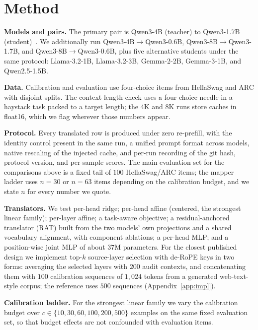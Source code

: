 \documentclass{article} %
\begin{document}

\section{Method}
\label{sec:method}

\textbf{Models and pairs.} The primary pair is Qwen3-4B (teacher) to Qwen3-1.7B
(student)~\citep{qwen3}. We additionally run Qwen3-4B$\to$Qwen3-0.6B, Qwen3-8B$\to$Qwen3-1.7B,
and Qwen3-8B$\to$Qwen3-0.6B, plus five alternative students under the same
protocol: Llama-3.2-1B, Llama-3.2-3B, Gemma-2-2B, Gemma-3-1B, and Qwen2.5-1.5B.

\textbf{Data.} Calibration and evaluation use four-choice items from HellaSwag
and ARC with disjoint splits. The context-length check uses a four-choice
needle-in-a-haystack task packed to a target length; the $4$K and $8$K runs
store caches in float16, which we flag wherever those numbers appear.

\textbf{Protocol.} Every translated row is produced under zero re-prefill, with
the identity control present in the same run, a unified prompt format across
models, native rescaling of the injected cache, and per-run recording of the git
hash, protocol version, and per-sample scores. The main evaluation set for the
comparisons above is a fixed tail of $100$ HellaSwag/ARC items; the mapper ladder
uses $n=30$ or $n=63$ items depending on the calibration budget, and we state $n$
for every number we quote.

\textbf{Translators.} We test per-head ridge; per-head affine (centered, the
strongest linear family); per-layer affine; a task-aware objective; a
residual-anchored translator (RAT) built from the two
models' own projections and a shared vocabulary alignment, with component
ablations; a per-head MLP; and a position-wise joint MLP of about $37$M
parameters. For the closest published design we implement top-$k$ source-layer
selection with de-RoPE keys \citep{heo2026} in two forms: averaging the selected
layers with $200$ audit contexts, and concatenating them with $100$ calibration
sequences of $1{,}024$ tokens from a generated web-text-style corpus; the
reference uses $500$ sequences (Appendix~\ref{app:impl}).

\textbf{Calibration ladder.} For the strongest linear family we vary the
calibration budget over $c\in\{10,30,60,100,200,500\}$ examples on the same
fixed evaluation set, so that budget effects are not confounded with evaluation
items.
\end{document}
